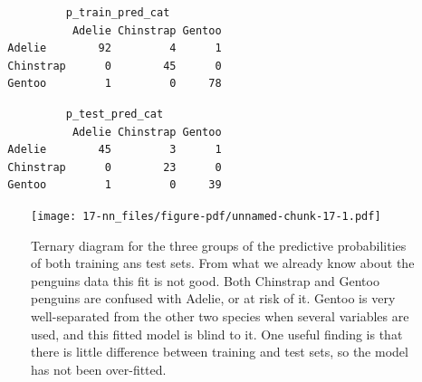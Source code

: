 \documentclass[
  letterpaper,
]{krantz}
\newenvironment{Shaded}{\begin{snugshade}}{\end{snugshade}}
\newcommand{\AttributeTok}[1]{\textcolor[rgb]{0.40,0.45,0.13}{#1}}
\newcommand{\DecValTok}[1]{\textcolor[rgb]{0.68,0.00,0.00}{#1}}
\newcommand{\FunctionTok}[1]{\textcolor[rgb]{0.28,0.35,0.67}{#1}}
\newcommand{\NormalTok}[1]{\textcolor[rgb]{0.00,0.23,0.31}{#1}}
\newcommand{\OtherTok}[1]{\textcolor[rgb]{0.00,0.23,0.31}{#1}}
\newcommand{\SpecialCharTok}[1]{\textcolor[rgb]{0.37,0.37,0.37}{#1}}
\begin{document}
\begin{verbatim}
           p_train_pred_cat
            Adelie Chinstrap Gentoo
  Adelie        92         4      1
  Chinstrap      0        45      0
  Gentoo         1         0     78
\end{verbatim}

\begin{Shaded}
\end{Shaded}

\begin{verbatim}
           p_test_pred_cat
            Adelie Chinstrap Gentoo
  Adelie        45         3      1
  Chinstrap      0        23      0
  Gentoo         1         0     39
\end{verbatim}

\begin{figure}[H]

{\centering \texttt{[image: 17-nn\_files/figure-pdf/unnamed-chunk-17-1.pdf]}

}

\caption{Ternary diagram for the three groups of the predictive
probabilities of both training ans test sets. From what we already know
about the penguins data this fit is not good. Both Chinstrap and Gentoo
penguins are confused with Adelie, or at risk of it. Gentoo is very
well-separated from the other two species when several variables are
used, and this fitted model is blind to it. One useful finding is that
there is little difference between training and test sets, so the model
has not been over-fitted.}

\end{figure}%
\end{document}
